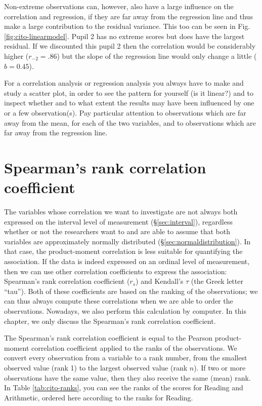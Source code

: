 \documentclass[
]{book}
\begin{document}
Non-extreme observations can, however, also have a large influence on the
correlation and regression, if they are far away from the regression line
and thus make a large contribution to the residual variance. This too can be seen in
Fig.\ref{fig:cito-linearmodel}.
Pupil 2 has no extreme scores
but does have the largest residual. If we discounted this pupil 2 then the
correlation would be considerably higher
(\(r_{-2}=.86\)) but the slope of the regression line would only
change a little (\(b=0.45\)).

For a correlation analysis or regression analysis you always have
to make and study a scatter plot, in order to see the pattern for yourself (is it linear?) and to inspect whether and to what extent the results
may have been influenced by one or a few observation(s). Pay
particular attention to observations which are far away from the mean, for each
of the two variables, and to observations which are far away from the regression line.

\section{Spearman's rank correlation coefficient}\label{sec:Spearman}

The variables whose correlation we want to investigate
are not always both expressed on the interval level of measurement
(§\ref{sec:interval}), regardless whether or not the researchers
want to and are able to assume that both variables are
approximately normally distributed
(§\ref{sec:normaldistribution}).
In that case, the product-moment correlation is less suitable for
quantifying the association. If the data is indeed expressed on an
ordinal level of measurement, then we can use other correlation coefficients
to express the association: Spearman's rank correlation coefficient
(\(r_s\)) and Kendall's \(\tau\) (the Greek letter ``tau''). Both of these coefficients
are based on the ranking of the observations; we can thus always compute these correlations
when we are able to order the observations. Nowadays, we also perform this calculation
by computer. In this chapter, we only discuss the Spearman's rank correlation
coefficient.

The Spearman's rank correlation coefficient is equal to the Pearson
product-moment correlation coefficient applied to the ranks of
the observations. We convert every observation from a variable to
a rank number, from the smallest observed value (rank 1)
to the largest observed value (rank \(n\)). If two or more observations
have the same value, then they also receive the same
(mean) rank. In
Table \ref{tab:cito-ranks}, you can see the ranks of the scores for Reading
and Arithmetic, ordered here according to the ranks for Reading.
\end{document}
